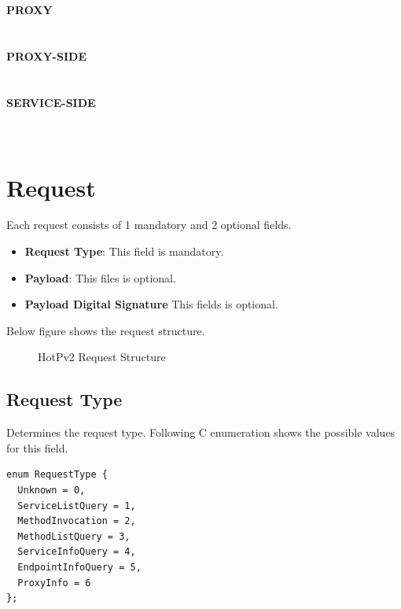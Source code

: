 \documentclass[10pt,a4paper]{article}
\begin{document}
  \textbf {PROXY} \\  \\\\
  \textbf {PROXY-SIDE} \\  \\\\
  \textbf {SERVICE-SIDE} \\  \\\\

\section {Request}
Each request consists of 1 mandatory and 2 optional fields.
\begin{itemize}
  \item \textbf{Request Type}: This field is mandatory.
  \item \textbf{Payload}: This files is optional. 
  \item \textbf{Payload Digital Signature} This fields is optional. 
\end{itemize} 
Below figure shows the request structure.

\begin{figure}[!ht]
  \caption{HotPv2 Request Structure}
  \centering
\end{figure}

\subsection {Request Type}
Determines the request type. Following C enumeration shows the possible values for this field.

\begin{verbatim}
enum RequestType { 
  Unknown = 0, 
  ServiceListQuery = 1, 
  MethodInvocation = 2,
  MethodListQuery = 3,
  ServiceInfoQuery = 4,
  EndpointInfoQuery = 5,
  ProxyInfo = 6
};
\end{verbatim}
\end{document}
